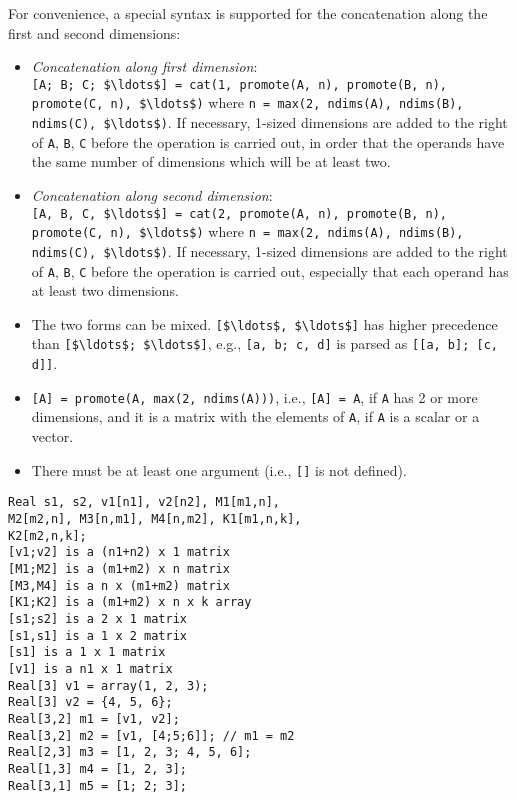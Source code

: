 For convenience, a special syntax is supported for the concatenation along the first and second dimensions:
\begin{itemize}
\item
  \emph{Concatenation along first dimension}:\\
  \lstinline![A; B; C; $\ldots$] = cat(1, promote(A, n), promote(B, n), promote(C, n), $\ldots$)! where \lstinline!n = max(2, ndims(A), ndims(B), ndims(C), $\ldots$)!.
  If necessary, 1-sized dimensions are added to the right of \lstinline!A!, \lstinline!B!, \lstinline!C! before the operation is carried out, in order that the operands have the same number of dimensions which will be at least two.
\item
  \emph{Concatenation along second dimension}:\\
  \lstinline![A, B, C, $\ldots$] = cat(2, promote(A, n), promote(B, n), promote(C, n), $\ldots$)! where \lstinline!n = max(2, ndims(A), ndims(B), ndims(C), $\ldots$)!.
  If necessary, 1-sized dimensions are added to the right of \lstinline!A!, \lstinline!B!, \lstinline!C! before the operation is carried out, especially that each operand has at least two dimensions.
\item
  The two forms can be mixed.
  \lstinline![$\ldots$, $\ldots$]! has higher precedence than \lstinline![$\ldots$; $\ldots$]!, e.g., \lstinline![a, b; c, d]! is parsed as \lstinline![[a, b]; [c, d]]!.
\item
  \lstinline![A] = promote(A, max(2, ndims(A)))!, i.e., \lstinline![A] = A!, if \lstinline!A! has 2 or more dimensions, and it is a matrix with the elements of \lstinline!A!, if \lstinline!A! is a scalar or a vector.
\item
  There must be at least one argument (i.e., \lstinline![]! is not defined).
\end{itemize}

\begin{example}
\begin{lstlisting}[language=modelica]
Real s1, s2, v1[n1], v2[n2], M1[m1,n],
M2[m2,n], M3[n,m1], M4[n,m2], K1[m1,n,k],
K2[m2,n,k];
[v1;v2] is a (n1+n2) x 1 matrix
[M1;M2] is a (m1+m2) x n matrix
[M3,M4] is a n x (m1+m2) matrix
[K1;K2] is a (m1+m2) x n x k array
[s1;s2] is a 2 x 1 matrix
[s1,s1] is a 1 x 2 matrix
[s1] is a 1 x 1 matrix
[v1] is a n1 x 1 matrix
Real[3] v1 = array(1, 2, 3);
Real[3] v2 = {4, 5, 6};
Real[3,2] m1 = [v1, v2];
Real[3,2] m2 = [v1, [4;5;6]]; // m1 = m2
Real[2,3] m3 = [1, 2, 3; 4, 5, 6];
Real[1,3] m4 = [1, 2, 3];
Real[3,1] m5 = [1; 2; 3];
\end{lstlisting}
\end{example}

